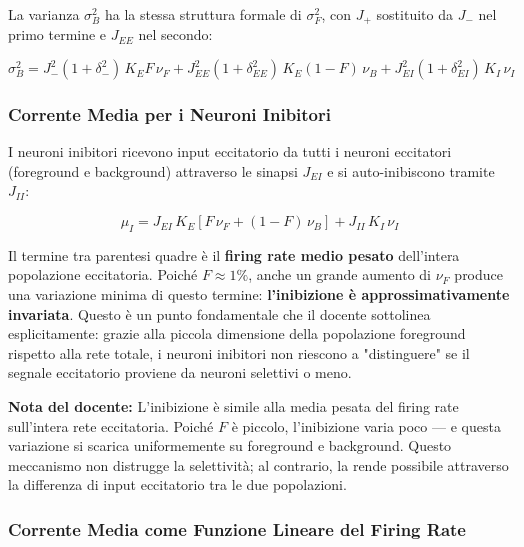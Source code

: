 La varianza $\sigma_B^2$ ha la stessa struttura formale di $\sigma_F^2$, con $J_+$ sostituito da $J_-$ nel primo termine e $J_{EE}$ nel secondo:

\begin{equation}
\sigma_B^2 = J_-^2 (1+\delta_-^2)\, K_E F\, \nu_F + J_{EE}^2 (1+\delta_{EE}^2)\, K_E (1-F)\, \nu_B + J_{EI}^2 (1+\delta_{EI}^2)\, K_I\, \nu_I
\end{equation}

\subsubsection{Corrente Media per i Neuroni Inibitori}

I neuroni inibitori ricevono input eccitatorio da tutti i neuroni eccitatori (foreground e background) attraverso le sinapsi $J_{EI}$ e si auto-inibiscono tramite $J_{II}$:

\begin{equation}
\mu_I = J_{EI} \, K_E \left[ F \, \nu_F + (1-F) \, \nu_B \right] + J_{II} \, K_I \, \nu_I
\end{equation}

Il termine tra parentesi quadre è il \textbf{firing rate medio pesato} dell'intera popolazione eccitatoria. Poiché $F \approx 1\%$, anche un grande aumento di $\nu_F$ produce una variazione minima di questo termine: \textbf{l'inibizione è approssimativamente invariata}. Questo è un punto fondamentale che il docente sottolinea esplicitamente: grazie alla piccola dimensione della popolazione foreground rispetto alla rete totale, i neuroni inibitori non riescono a "distinguere" se il segnale eccitatorio proviene da neuroni selettivi o meno.

\begin{tcolorbox}[colback=gray!5, colframe=gray!40, arc=2mm, boxrule=0.5pt]
\textbf{Nota del docente:} L'inibizione è simile alla media pesata del firing rate sull'intera rete eccitatoria. Poiché $F$ è piccolo, l'inibizione varia poco — e questa variazione si scarica uniformemente su foreground e background. Questo meccanismo non distrugge la selettività; al contrario, la rende possibile attraverso la differenza di input eccitatorio tra le due popolazioni.
\end{tcolorbox}




\subsubsection{Corrente Media come Funzione Lineare del Firing Rate}

